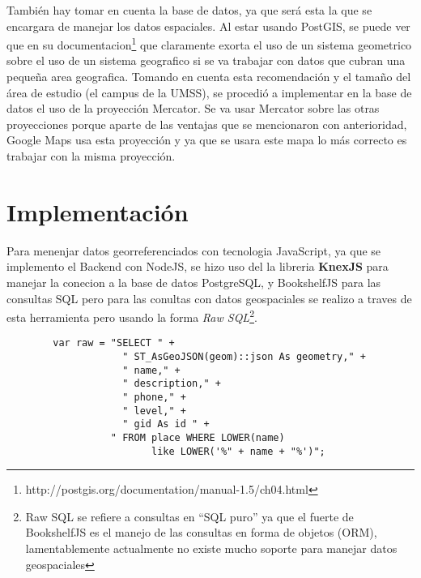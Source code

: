         También hay tomar en cuenta la base de datos, ya que será esta la que se encargara de manejar los datos espaciales. Al estar usando PostGIS, se puede ver que en su documentacion\footnote{ http://postgis.org/documentation/manual-1.5/ch04.html} que claramente exorta el uso de un sistema geometrico sobre el uso de un sistema geografico si  se va trabajar con datos que cubran una peque\~na area geografica. Tomando en cuenta esta recomendaci\'on y el tama\~no del área de estudio (el campus de la UMSS), se procedió a implementar en la base de datos el uso de la proyecci\'on Mercator. Se va usar Mercator sobre las otras proyecciones porque aparte de las ventajas que se mencionaron con anterioridad, Google Maps usa esta proyecci\'on y ya que se usara este mapa lo más correcto es trabajar con la misma proyecci\'on.




  \section{Implementaci\'on} %
  \label{sec:Implementacion}
    Para menenjar datos georreferenciados con tecnologia JavaScript, ya que se implemento el Backend con NodeJS, se hizo uso del la libreria \textbf{KnexJS} para manejar la conecion a la base de datos PostgreSQL, y BookshelfJS para las consultas SQL pero para las conultas con datos geospaciales se realizo a traves de esta herramienta pero usando la forma \emph{Raw SQL}\footnote{Raw SQL se refiere a consultas en ``SQL puro'' ya que el fuerte de BookshelfJS es el manejo de las consultas en forma de objetos (ORM), lamentablemente actualmente no existe mucho soporte para manejar datos geospaciales}.

    \begin{center}
      \begin{verbatim}
        var raw = "SELECT " +
                    " ST_AsGeoJSON(geom)::json As geometry," +
                    " name," +
                    " description," +
                    " phone," +
                    " level," +
                    " gid As id " +
                  " FROM place WHERE LOWER(name)
                         like LOWER('%" + name + "%')";
      \end{verbatim}
    \end{center}

